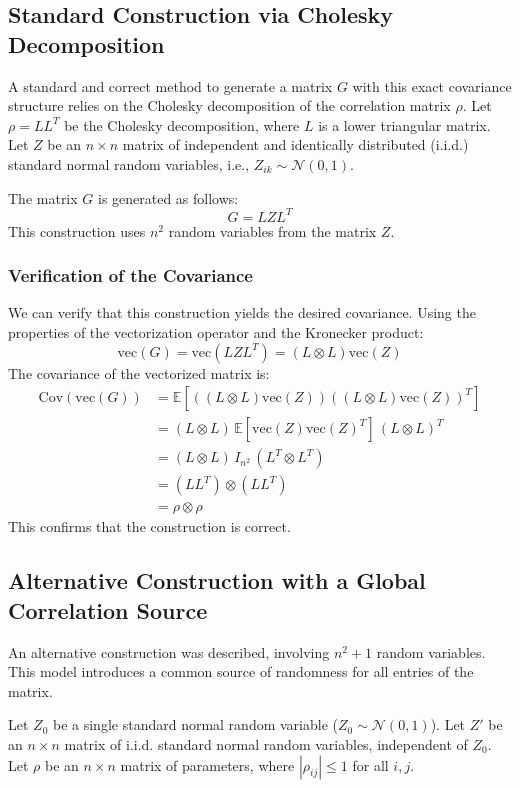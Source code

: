 \documentclass[12pt]{article}
\begin{document}
\subsection{Standard Construction via Cholesky Decomposition}
A standard and correct method to generate a matrix $G$ with this exact covariance structure relies on the Cholesky decomposition of the correlation matrix $\rho$.
Let $\rho = L L^T$ be the Cholesky decomposition, where $L$ is a lower triangular matrix. Let $Z$ be an $n \times n$ matrix of independent and identically distributed (i.i.d.) standard normal random variables, i.e., $Z_{ik} \sim \mathcal{N}(0,1)$.

The matrix $G$ is generated as follows:
\[
G = L Z L^T
\]
This construction uses $n^2$ random variables from the matrix $Z$.

\subsubsection*{Verification of the Covariance}
We can verify that this construction yields the desired covariance. Using the properties of the vectorization operator and the Kronecker product:
\[
\text{vec}(G) = \text{vec}(L Z L^T) = (L \otimes L) \text{vec}(Z)
\]
The covariance of the vectorized matrix is:
\begin{align*}
\text{Cov}(\text{vec}(G)) &= \mathbb{E}\left[ ((L \otimes L) \text{vec}(Z)) ((L \otimes L) \text{vec}(Z))^T \right] \\
&= (L \otimes L) \, \mathbb{E}[\text{vec}(Z) \text{vec}(Z)^T] \, (L \otimes L)^T \\
&= (L \otimes L) \, I_{n^2} \, (L^T \otimes L^T) \\
&= (L L^T) \otimes (L L^T) \\
&= \rho \otimes \rho
\end{align*}
This confirms that the construction is correct.

\subsection{Alternative Construction with a Global Correlation Source}
An alternative construction was described, involving $n^2+1$ random variables. This model introduces a common source of randomness for all entries of the matrix.

Let $Z_0$ be a single standard normal random variable ($Z_0 \sim \mathcal{N}(0,1)$). Let $Z'$ be an $n \times n$ matrix of i.i.d. standard normal random variables, independent of $Z_0$. Let $\rho$ be an $n \times n$ matrix of parameters, where $|\rho_{ij}| \le 1$ for all $i,j$.
\end{document}

